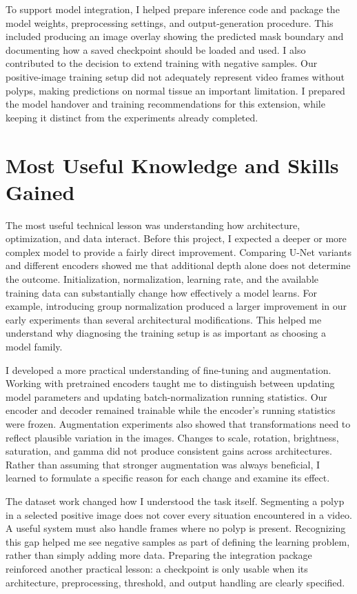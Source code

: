 \documentclass[11pt,a4paper]{article}
\begin{document}
To support model integration, I helped prepare inference code and package the model weights, preprocessing settings, and output-generation procedure. This included producing an image overlay showing the predicted mask boundary and documenting how a saved checkpoint should be loaded and used. I also contributed to the decision to extend training with negative samples. Our positive-image training setup did not adequately represent video frames without polyps, making predictions on normal tissue an important limitation. I prepared the model handover and training recommendations for this extension, while keeping it distinct from the experiments already completed.

\section{Most Useful Knowledge and Skills Gained}
The most useful technical lesson was understanding how architecture, optimization, and data interact. Before this project, I expected a deeper or more complex model to provide a fairly direct improvement. Comparing U-Net variants and different encoders showed me that additional depth alone does not determine the outcome. Initialization, normalization, learning rate, and the available training data can substantially change how effectively a model learns. For example, introducing group normalization produced a larger improvement in our early experiments than several architectural modifications. This helped me understand why diagnosing the training setup is as important as choosing a model family.

I developed a more practical understanding of fine-tuning and augmentation. Working with pretrained encoders taught me to distinguish between updating model parameters and updating batch-normalization running statistics. Our encoder and decoder remained trainable while the encoder's running statistics were frozen. Augmentation experiments also showed that transformations need to reflect plausible variation in the images. Changes to scale, rotation, brightness, saturation, and gamma did not produce consistent gains across architectures. Rather than assuming that stronger augmentation was always beneficial, I learned to formulate a specific reason for each change and examine its effect.

The dataset work changed how I understood the task itself. Segmenting a polyp in a selected positive image does not cover every situation encountered in a video. A useful system must also handle frames where no polyp is present. Recognizing this gap helped me see negative samples as part of defining the learning problem, rather than simply adding more data. Preparing the integration package reinforced another practical lesson: a checkpoint is only usable when its architecture, preprocessing, threshold, and output handling are clearly specified.
\end{document}
